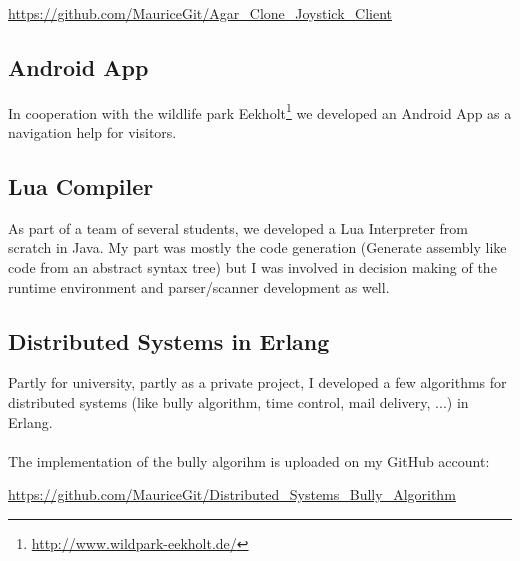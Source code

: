 \documentclass[a4paper, 12pt]{article}
\begin{document}
\begin{center}
	\url{https://github.com/MauriceGit/Agar_Clone_Joystick_Client}
\end{center}

\subsection{Android App}

In cooperation with the wildlife park Eekholt\footnote{\url{http://www.wildpark-eekholt.de/}} we developed an Android 
App as a navigation help for visitors. 

\subsection{Lua Compiler}

As part of a team of several students, we developed a Lua Interpreter from scratch in Java. My part was mostly the 
code generation (Generate assembly like code from an abstract syntax tree) but I was involved in decision making
of the runtime environment and parser/scanner development as well. 

\subsection{Distributed Systems in Erlang}
 
Partly for university, partly as a private project, I developed a few algorithms for distributed systems (like 
bully algorithm, time control, mail delivery, ...) in Erlang.
\\
\\
The implementation of the bully algorihm is uploaded on my GitHub account:
\begin{center}
	\url{https://github.com/MauriceGit/Distributed_Systems_Bully_Algorithm}
\end{center}

 
\end{document}
